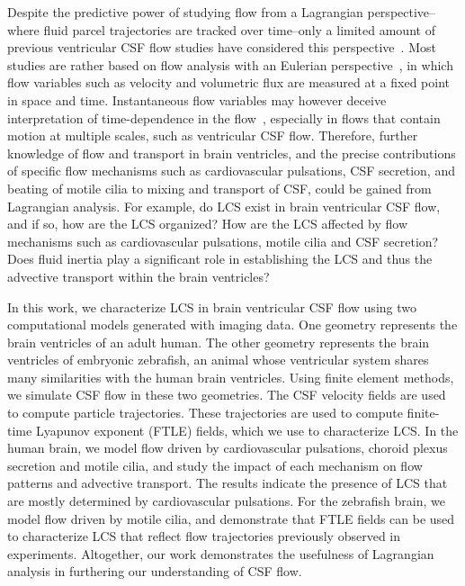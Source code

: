 \documentclass{template}
\begin{document}
Despite the predictive power of studying flow from a
Lagrangian perspective--where fluid parcel trajectories are tracked over time--only
a limited amount of previous ventricular CSF flow studies
have considered this perspective~\cite{Yoshida2022EffectVentricles}.
Most studies are rather based on flow analysis with an
Eulerian perspective~\cite{Kurtcuoglu2007ComputationalSylvius,
Causemann2022HumanFramework, howden2008three, Sweetman2011ThreeDimensional,
Siyahhan2014FlowVentricles},
in which flow variables such as velocity and volumetric flux
are measured at a fixed point in space and time.
Instantaneous flow variables may however deceive
interpretation of time-dependence in the flow~\cite{shadden2005definition},
especially in flows that contain motion at multiple scales,
such as ventricular CSF flow. Therefore,
further knowledge of flow and transport in brain ventricles,
and the precise contributions of specific
flow mechanisms such as cardiovascular pulsations, CSF secretion,
and beating of motile cilia to mixing and transport of CSF,
could be gained from Lagrangian analysis.
For example, do LCS exist in brain ventricular CSF flow,
and if so, how are the LCS organized?
How are the LCS affected by flow mechanisms
such as cardiovascular pulsations, motile cilia and CSF secretion?
Does fluid inertia play a significant role in establishing the
LCS and thus the advective transport within the brain ventricles?

In this work, we characterize LCS in brain ventricular CSF flow
using two computational models generated with imaging data.
One geometry represents the brain ventricles of an adult human. The other
geometry represents the brain ventricles of embryonic zebrafish, an animal whose
ventricular system shares many similarities with the human brain ventricles.
Using finite element methods, we simulate CSF flow
in these two geometries. The CSF velocity fields are used to
compute particle trajectories. These trajectories are used to
compute finite-time Lyapunov exponent (FTLE) fields, which
we use to characterize LCS. In the human brain, we model
flow driven by cardiovascular pulsations, choroid plexus secretion and motile cilia,
and study the impact of each mechanism on flow patterns and advective transport.
The results indicate the presence of LCS that are mostly determined
by cardiovascular pulsations. For the zebrafish brain, we model flow
driven by motile cilia, and demonstrate that FTLE fields can be
used to characterize LCS that reflect flow trajectories
previously observed in experiments. Altogether, our work demonstrates the usefulness of
Lagrangian analysis in furthering our understanding of CSF flow.
\end{document}
